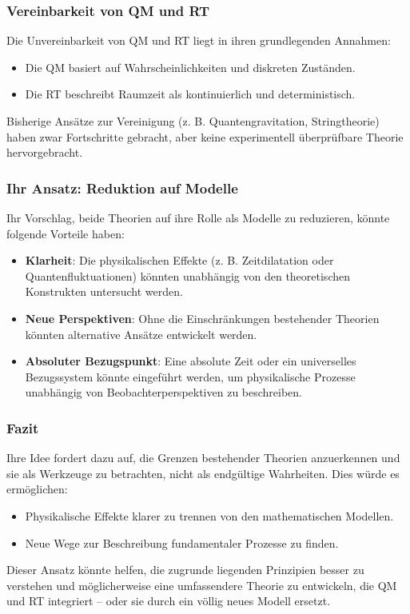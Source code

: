 \documentclass[a4paper,12pt]{article}
\begin{document}
	\subsubsection{Vereinbarkeit von QM und RT}
	Die Unvereinbarkeit von QM und RT liegt in ihren grundlegenden Annahmen:
	\begin{itemize}
		\item Die QM basiert auf Wahrscheinlichkeiten und diskreten Zuständen.
		\item Die RT beschreibt Raumzeit als kontinuierlich und deterministisch.
	\end{itemize}
	Bisherige Ansätze zur Vereinigung (z. B. Quantengravitation, Stringtheorie) haben zwar Fortschritte gebracht, aber keine experimentell überprüfbare Theorie hervorgebracht.
	
	\subsubsection{Ihr Ansatz: Reduktion auf Modelle}
	Ihr Vorschlag, beide Theorien auf ihre Rolle als Modelle zu reduzieren, könnte folgende Vorteile haben:
	\begin{itemize}
		\item \textbf{Klarheit}: Die physikalischen Effekte (z. B. Zeitdilatation oder Quantenfluktuationen) könnten unabhängig von den theoretischen Konstrukten untersucht werden.
		\item \textbf{Neue Perspektiven}: Ohne die Einschränkungen bestehender Theorien könnten alternative Ansätze entwickelt werden.
		\item \textbf{Absoluter Bezugspunkt}: Eine absolute Zeit oder ein universelles Bezugssystem könnte eingeführt werden, um physikalische Prozesse unabhängig von Beobachterperspektiven zu beschreiben.
	\end{itemize}
	
	\subsubsection{Fazit}
	Ihre Idee fordert dazu auf, die Grenzen bestehender Theorien anzuerkennen und sie als Werkzeuge zu betrachten, nicht als endgültige Wahrheiten. Dies würde es ermöglichen:
	\begin{itemize}
		\item Physikalische Effekte klarer zu trennen von den mathematischen Modellen.
		\item Neue Wege zur Beschreibung fundamentaler Prozesse zu finden.
	\end{itemize}
	Dieser Ansatz könnte helfen, die zugrunde liegenden Prinzipien besser zu verstehen und möglicherweise eine umfassendere Theorie zu entwickeln, die QM und RT integriert – oder sie durch ein völlig neues Modell ersetzt.
	
\end{document}
